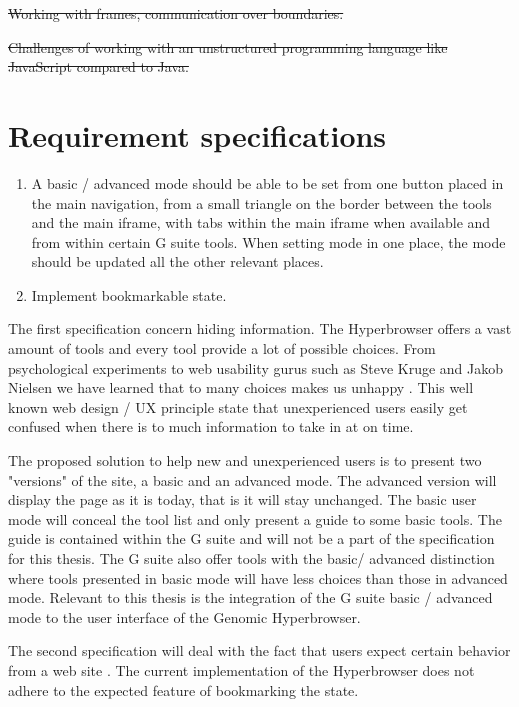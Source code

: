 \documentclass[english]{ifimaster}
\begin{document}
\sout{Working with frames, communication over boundaries.}

\sout{Challenges of working with an unstructured programming language like JavaScript compared to Java.}

\section{Requirement specifications}
\begin{enumerate}
\item A basic / advanced mode should be able to be set from one button placed in the main navigation, from a small triangle on the border between the tools and the main iframe, with tabs within the main iframe when available and from within certain G suite tools. When setting mode in one place, the mode should be updated all the other relevant places.

\item Implement bookmarkable state.

\end{enumerate}

The first specification concern hiding information. The Hyperbrowser offers a vast amount of tools and every tool provide a lot of possible choices. From psychological experiments to web usability gurus such as Steve Kruge and Jakob Nielsen we have learned that to many choices makes us unhappy\parencite{schwartz2004paradox} \parencite{krug2005don} \parencite{nielsen1997user}. This well known web design / UX principle state that unexperienced users easily get confused when there is to much information to take in at on time.

The proposed solution to help new and unexperienced users is to present two "versions" of the site, a basic and an advanced mode. The advanced version will display the page as it is today, that is it will stay unchanged. The basic user mode will conceal the tool list and only present a guide to some basic tools. The guide is contained within the G suite and will not be a part of the specification for this thesis. The G suite also offer tools with the basic/ advanced distinction where tools presented in basic mode will have less choices than those in advanced mode. 
Relevant to this thesis is the integration of the G suite basic / advanced mode to the user interface of the Genomic Hyperbrowser. 

The second specification will deal with the fact that users expect certain behavior from a web site \parencite{mikowski} \parencite{nielsen1997user}. The current implementation of the Hyperbrowser does not adhere to the expected feature of bookmarking the state. 
\end{document}
